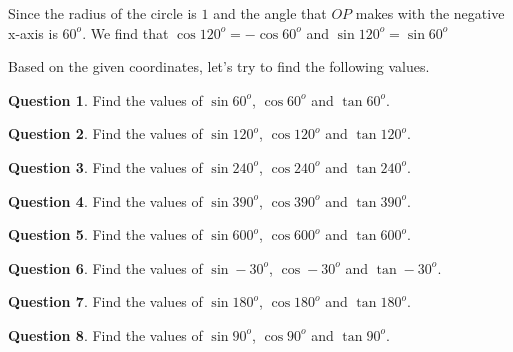 \documentclass{article}
\theoremstyle{definition}
\newtheorem{question}{Question}
\begin{document}
	Since the radius of the circle is $1$ and the angle that $OP$ makes with the negative x-axis is $60^o$. We find that $\cos 120^o = -\cos 60^o$ and $\sin 120^o = \sin 60^o$

Based on the given coordinates, let's try to find the following values.

\begin{question}
	Find the values of $\sin 60^o$, $\cos 60^o$ and $\tan 60^o$.
\end{question}
\begin{question}
	Find the values of $\sin 120^o$, $\cos 120^o$ and $\tan 120^o$.
\end{question}
\begin{question}
	 Find the values of $\sin 240^o$, $\cos 240^o$ and $\tan 240^o$.
\end{question}
\begin{question}
	Find the values of $\sin 390^o$, $\cos 390^o$ and $\tan 390^o$.
\end{question}
\begin{question}
	Find the values of $\sin 600^o$, $\cos 600^o$ and $\tan 600^o$.
\end{question}
\begin{question}
	Find the values of $\sin -30^o$, $\cos -30^o$ and $\tan -30^o$.
\end{question}
\begin{question}
	Find the values of $\sin 180^o$, $\cos 180^o$ and $\tan 180^o$.
\end{question}
\begin{question}
	Find the values of $\sin 90^o$, $\cos 90^o$ and $\tan 90^o$.
\end{question}
\end{document}
